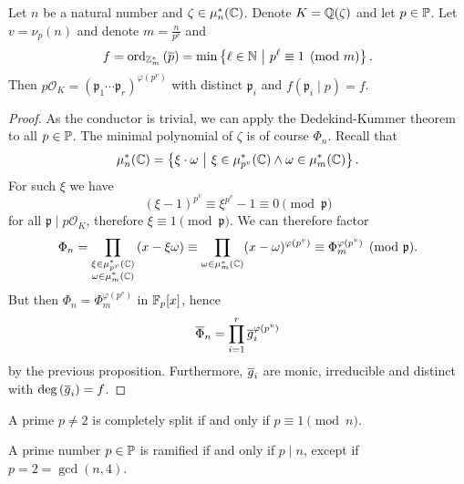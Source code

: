 
\begin{izrek}
Let $n$ be a natural number and $\zeta \in \mu_n^*(\C)$. Denote
$K = \Q(\zeta)$ and let $p \in \P$. Let $v = \nu_p(n)$ and denote
$m = \frac{n}{p^v}$ and
\[
f =
\ord_{\Z_m^*} \br{\oline{p}} =
\min \setb{\ell \in \N}{p^\ell \equiv 1 \pmod{m}}.
\]
Then
$p \mathcal{O}_K =
(\mathfrak{p}_1 \cdots \mathfrak{p}_r)^{\varphi(p^v)}$ with
distinct $\mathfrak{p}_i$ and $f(\mathfrak{p}_i \mid p) = f$.
\end{izrek}

\begin{proof}
As the conductor is trivial, we can apply the Dedekind-Kummer
theorem to all $p \in \P$. The minimal polynomial of $\zeta$ is of
course $\Phi_n$. Recall that
\[
\mu_n^*(\C) =
\setb{\xi \cdot \omega}
{\xi \in \mu_{p^v}^*(\C) \land \omega \in \mu_m^*(\C)}.
\]
For such $\xi$ we have
\[
(\xi - 1)^{p^v} \equiv \xi^{p^v} - 1 \equiv 0 \pmod{\mathfrak{p}}
\]
for all $\mathfrak{p} \mid p \mathcal{O}_K$, therefore
$\xi \equiv 1 \pmod{\mathfrak{p}}$. We can therefore factor
\[
\Phi_n =
\prod_{\substack{\xi \in \mu_{p^v}^*(\C) \\ \omega \in \mu_m^*(\C)}}
\br{x - \xi \omega} \equiv
\prod_{\omega \in \mu_m^*(\C)} (x - \omega)^{\varphi(p^v)} \equiv
\Phi_m^{\varphi(p^v)} \pmod{\mathfrak{p}}.
\]
But then $\Phi_n = \Phi_m^{\varphi(p^v)}$ in $\F_p[x]$, hence
\[
\oline{\Phi}_n = \prod_{i=1}^r \oline{g}_i^{\varphi(p^v)}
\]
by the previous proposition. Furthermore, $\oline{g}_i$ are monic,
irreducible and distinct with $\deg \br{\oline{g}_i} = f$.
\end{proof}

\begin{posledica}
A prime $p \ne 2$ is completely split if and only if
$p \equiv 1 \pmod{n}$.
\end{posledica}

\begin{posledica}
A prime number $p \in \P$ is ramified if and only if $p \mid n$,
except if $p = 2 = \gcd(n, 4)$.
\end{posledica}
